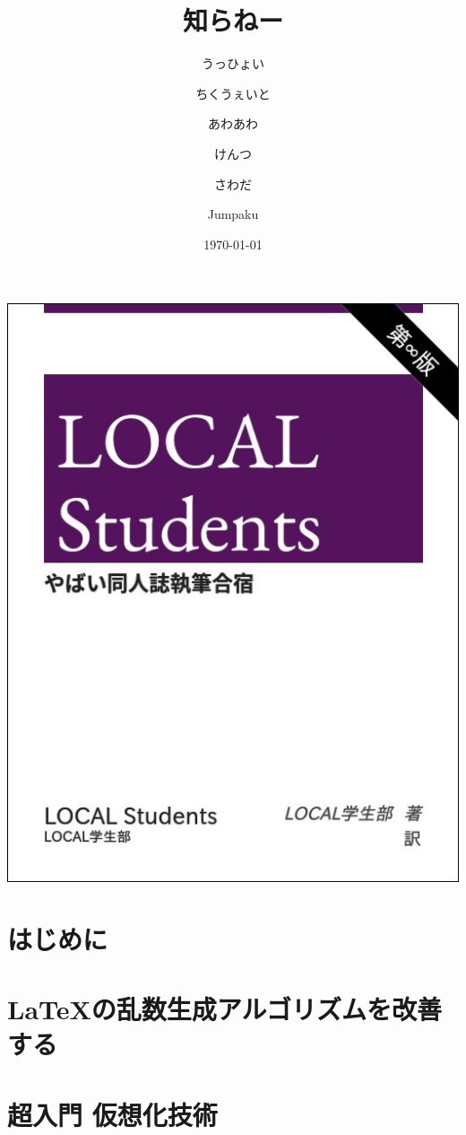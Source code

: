 \documentclass[autodetect-engine,dvipdfmx-if-dvi,ja=standard,a4paper,12pt,twoside,openany,layout=v2]{bxjsbook}
\title{知らねー}
\author{うっひょい \and ちくうぇいと \and あわあわ \and けんつ \and さわだ \and Jumpaku}
\date{\today}
\begin{document}
\begin{titlepage}
  \includegraphics{main.jpg}
\end{titlepage}
\maketitle
\frontmatter
\chapter{はじめに}


\tableofcontents
\mainmatter
{}
\chapter{\LaTeX の乱数生成アルゴリズムを改善する}


\chapter{超入門 仮想化技術}

\end{document}
